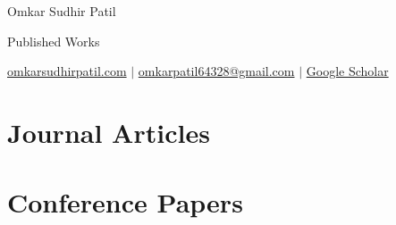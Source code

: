 \documentclass[10pt, letterpaper]{article}
\begin{document}
\begin{center}
    {\LARGE Omkar Sudhir Patil}
    
    \vspace{0.1 cm}
    {\normalsize Published Works}
    
    \vspace{0.05 cm}
    \href{https://omkarsudhirpatil.com}{omkarsudhirpatil.com} $|$ 
    \href{mailto:omkarpatil64328@gmail.com}{omkarpatil64328@gmail.com} $|$
    \href{https://scholar.google.com/citations?user=EtkfNQMAAAAJ}{Google Scholar}
\end{center}

\vspace{0.3 cm}

\nocite{*}

\section{Journal Articles}

\printbibliography[type=article, heading=none, nottype=inproceedings, nottype=book, maxnames=99]

\vspace{0.3 cm}

\section{Conference Papers}

\printbibliography[type=inproceedings, heading=none, maxnames=99]
\end{document}
